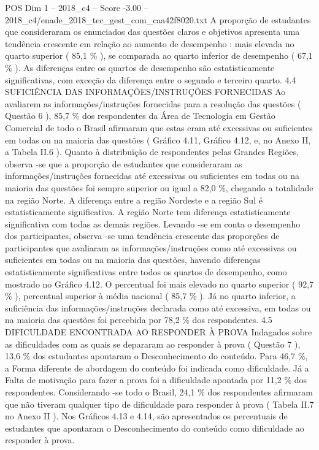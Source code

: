 \begin{textsample}{POS Dim 1 – 2018\_c4 – Score -3.00 – 2018\_c4/enade\_2018\_tec\_gest\_com\_caa42f8020.txt}
A proporção de estudantes que consideraram os enunciados das questões claros e objetivos apresenta uma tendência crescente em relação ao aumento de desempenho : mais elevada no quarto superior ( 85,1 \% ), se comparada ao quarto inferior de desempenho ( 67,1 \% ).
As diferenças entre os quartos de desempenho são estatisticamente significativas, com exceção da diferença entre o segundo e terceiro quarto. 4.4 SUFICIÊNCIA DAS INFORMAÇÕES/INSTRUÇÕES FORNECIDAS Ao avaliarem as informações/instruções fornecidas para a resolução das questões ( Questão 6 ), 85,7 \% dos respondentes da Área de Tecnologia em Gestão Comercial de todo o Brasil afirmaram que estas eram até excessivas ou suficientes em todas ou na maioria das questões ( Gráfico 4.11, Gráfico 4.12, e, no Anexo II, a Tabela II.6 ).
Quanto à distribuição de respondentes pelas Grandes Regiões, observa -se que a proporção de estudantes que consideraram as informações/instruções fornecidas até excessivas ou suficientes em todas ou na maioria das questões foi sempre superior ou igual a 82,0 \%, chegando a totalidade na região Norte.
A diferença entre a região Nordeste e a região Sul é estatisticamente significativa.
A região Norte tem diferença estatisticamente significativa com todas as demais regiões.
Levando -se em conta o desempenho dos participantes, observa -se uma tendência crescente das proporções de participantes que avaliaram as informações/instruções como até excessivas ou suficientes em todas ou na maioria das questões, havendo diferenças estatisticamente significativas entre todos os quartos de desempenho, como mostrado no Gráfico 4.12.
O percentual foi mais elevado no quarto superior ( 92,7 \% ), percentual superior à média nacional ( 85,7 \% ).
Já no quarto inferior, a suficiência das informações/instruções declarada como até excessiva, em todas ou na maioria das questões foi percebida por 78,2 \% dos respondentes. 4.5 DIFICULDADE ENCONTRADA AO RESPONDER À PROVA Indagados sobre as dificuldades com as quais se depararam ao responder à prova ( Questão 7 ), 13,6 \% dos estudantes apontaram o Desconhecimento do conteúdo.
Para 46,7 \%, a Forma diferente de abordagem do conteúdo foi indicada como dificuldade.
Já a Falta de motivação para fazer a prova foi a dificuldade apontada por 11,2 \% dos respondentes.
Considerando -se todo o Brasil, 24,1 \% dos respondentes afirmaram que não tiveram qualquer tipo de dificuldade para responder à prova ( Tabela II.7 no Anexo II ).
Nos Gráficos 4.13 e 4.14, são apresentados os percentuais de estudantes que apontaram o Desconhecimento do conteúdo como dificuldade ao responder à prova.

\end{textsample}
